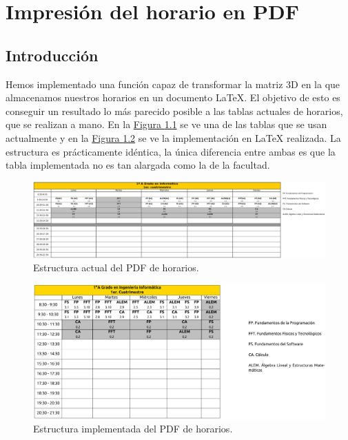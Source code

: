 \chapter{Impresión del horario en PDF}

\section{Introducción}
Hemos implementado una función capaz de transformar la matriz 3D en la que almacenamos nuestros horarios en un documento \LaTeX. El objetivo de esto es conseguir un resultado lo más parecido posible a las tablas actuales de horarios, que se realizan a mano. En la \hyperref[horario_actual]{Figura \ref*{horario_actual}} se ve una de las tablas que se usan actualmente y en la \hyperref[horario_implementado]{Figura \ref*{horario_implementado}} se ve la implementación en \LaTeX\; realizada. La estructura es prácticamente idéntica, la única diferencia entre ambas es que la tabla implementada no es tan alargada como la de la facultad.

\begin{figure}[H]
    \centering
    \includegraphics[width=\textwidth]{img/horario_actual}
    \caption{Estructura actual del PDF de horarios.}
    \label{horario_actual}
\end{figure}

\begin{figure}[H]
    \centering
    \includegraphics[width=\textwidth]{img/horario_implementado}
    \caption{Estructura implementada del PDF de horarios.}
    \label{horario_implementado}
\end{figure}

